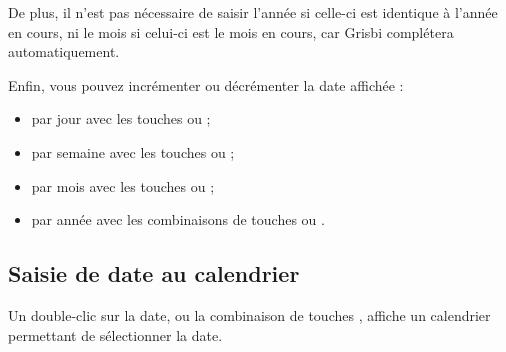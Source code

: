 De plus, il n'est pas nécessaire de saisir l'année si celle-ci est identique à l'année en cours, ni le mois si celui-ci est le mois en cours, car Grisbi complétera automatiquement.

Enfin, vous pouvez incrémenter ou décrémenter la date affichée :

\begin{itemize}
	 \item par jour avec les touches \key{+} ou \key{-} ;
	 \item par semaine avec les touches  \key{+} ou  \key{-} ;
	 \item par mois avec les touches ou  ;
	 \item par année avec les combinaisons de touches  
	ou  .
\end{itemize}


\subsection{Saisie de date au calendrier\label{transactions-new-calendar}}

Un double-clic sur la date, ou la combinaison de touches  , affiche un calendrier permettant de sélectionner la date.

